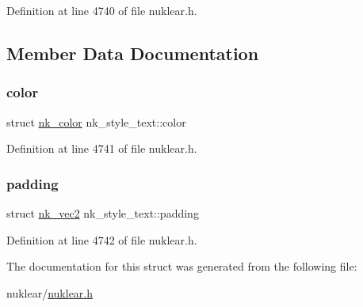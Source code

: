 Definition at line 4740 of file nuklear.\+h.



\subsection{Member Data Documentation}
\mbox{\label{structnk__style__text_a21064eb801febacffa14146f95ca7d74}} 
\subsubsection{\texorpdfstring{color}{color}}
{\footnotesize\ttfamily struct \mbox{\hyperlink{structnk__color}{nk\+\_\+color}} nk\+\_\+style\+\_\+text\+::color}



Definition at line 4741 of file nuklear.\+h.

\mbox{\label{structnk__style__text_a1939fda3b4e6295ec5645394a4fbc538}} 
\subsubsection{\texorpdfstring{padding}{padding}}
{\footnotesize\ttfamily struct \mbox{\hyperlink{structnk__vec2}{nk\+\_\+vec2}} nk\+\_\+style\+\_\+text\+::padding}



Definition at line 4742 of file nuklear.\+h.



The documentation for this struct was generated from the following file\+:\begin{DoxyCompactItemize}
\item 
nuklear/\mbox{\hyperlink{nuklear_8h}{nuklear.\+h}}\end{DoxyCompactItemize}
